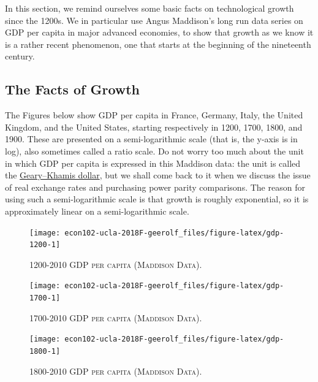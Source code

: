 \documentclass[]{book}
\begin{document}
In this section, we remind ourselves some basic facts on technological
growth since the 1200s. We in particular use Angus Maddison's long run
data series on GDP per capita in major advanced economies, to show that
growth as we know it is a rather recent phenomenon, one that starts at
the beginning of the nineteenth century.

\subsection{The Facts of Growth}\label{the-facts-of-growth}

The Figures below show GDP per capita in France, Germany, Italy, the
United Kingdom, and the United States, starting respectively in 1200,
1700, 1800, and 1900. These are presented on a semi-logarithmic scale
(that is, the y-axis is in log), also sometimes called a ratio scale. Do
not worry too much about the unit in which GDP per capita is expressed
in this Maddison data: the unit is called the
\href{https://en.wikipedia.org/wiki/Geary\%E2\%80\%93Khamis_dollar}{Geary--Khamis
dollar}, but we shall come back to it when we discuss the issue of real
exchange rates and purchasing power parity comparisons. The reason for
using such a semi-logarithmic scale is that growth is roughly
exponential, so it is approximately linear on a semi-logarithmic scale.



\begin{figure}

{\centering \texttt{[image: econ102-ucla-2018F-geerolf\_files/figure-latex/gdp-1200-1]} 

}

\caption{\textsc{1200-2010 GDP per capita (Maddison Data)}.}\label{fig:gdp-1200}
\end{figure}



\begin{figure}

{\centering \texttt{[image: econ102-ucla-2018F-geerolf\_files/figure-latex/gdp-1700-1]} 

}

\caption{\textsc{1700-2010 GDP per capita (Maddison Data)}.}\label{fig:gdp-1700}
\end{figure}



\begin{figure}

{\centering \texttt{[image: econ102-ucla-2018F-geerolf\_files/figure-latex/gdp-1800-1]} 

}

\caption{\textsc{1800-2010 GDP per capita (Maddison Data)}.}\label{fig:gdp-1800}
\end{figure}
\end{document}

